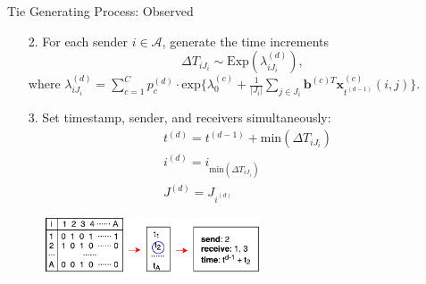 \documentclass[10pt]{beamer}
\theoremstyle{definition}
\theoremstyle{remark}
\begin{document}
\begin{frame}{Tie Generating Process: Observed}
\begin{itemize}
		\item [2.] For each sender $i \in \mathcal{A}$, generate the time increments 
		\footnotesize	\begin{equation*}
		\Delta T_{i{J_i}} \sim \mbox{Exp}(\lambda_{i{J_i}}^{(d)}),
		\end{equation*}\normalsize
		where \footnotesize$\lambda^{(d)}_{iJ_i}= \sum\limits_{c=1}^{C} p^{(d)}_c\cdot\mbox{exp}\Big\{\lambda^{(c)}_0+\frac{1}{|J_i|}\sum\limits_{j \in J_i} \boldsymbol{b}^{(c)T}\boldsymbol{x}^{(c)}_{t^{(d-1)}}(i, j)\Big\}.$\normalsize\vspace{0.4cm}
		\item[3.] Set timestamp, sender, and receivers simultaneously:
		\footnotesize	\begin{equation*}
		\begin{aligned}
		&t^{(d)} = t^{(d-1)}+\mbox{min}(\Delta T_{i{J_i}})\\
		&i^{(d)} = i_{\mbox{min}(\Delta T_{i{J_i}})} \\
		&J^{(d)} = J_{i^{(d)}}
		\end{aligned}
		\end{equation*}
		\normalsize
\end{itemize}
 \begin{figure}
 	\includegraphics[width=0.57\textwidth]{figures/tie.pdf}
 \end{figure}	
\end{frame}
\end{document}
